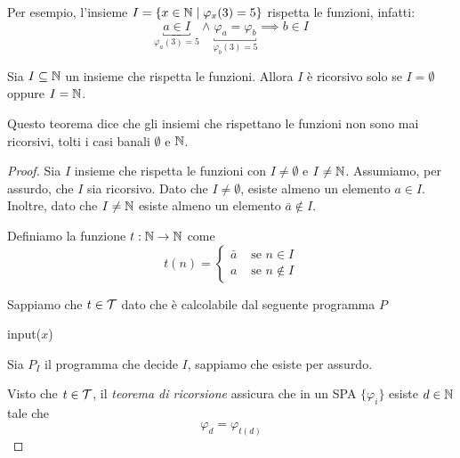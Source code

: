 Per esempio, l'insieme $I = \left\{x \in \mathbb{N} \mid \varphi_x (3) = 5 \right\}$ rispetta le funzioni, infatti:
$$
\underbracket{a \in I}_{\varphi_a (3) = 5} \wedge \underbracket{\varphi_a = \varphi_b}_{\varphi_b(3) = 5} \implies b \in I
$$

\begin{theor}
	Sia $I \subseteq \mathbb{N}$ un insieme che rispetta le funzioni. Allora $I$ è ricorsivo solo se $I = \emptyset$ oppure $I = \mathbb{N}$.
\end{theor}

Questo teorema dice che gli insiemi che rispettano le funzioni non sono mai ricorsivi, tolti i casi banali $\emptyset$ e $\mathbb{N}$.

\begin{proof}
	Sia $I$ insieme che rispetta le funzioni con $I \neq \emptyset$ e $I \neq \mathbb{N}$. Assumiamo, per assurdo, che $I$ sia ricorsivo. Dato che $I \neq \emptyset$, esiste almeno un elemento $a \in I$. Inoltre, dato che $I \neq \mathbb{N}$ esiste almeno un elemento $\bar{a} \notin I$.

	Definiamo la funzione $t: \mathbb{N} \rightarrow \mathbb{N}$ come
	$$
	t(n) = \begin{cases}
		\bar{a} & \text{ se } n \in I \\
		a & \text{ se } n \notin I
	\end{cases}
	$$

	Sappiamo che $t \in \mathcal{T}$ dato che è calcolabile dal seguente programma $P$
	\begin{center}
		\begin{minipage}{.45\textwidth}
			\begin{tcolorbox}[
				colback=white,
				sharp corners,
				boxrule=.3mm,
				left=20pt,
				top=0pt,
				bottom=0pt,
				colbacktitle=white,
				coltitle=black
				]
				\begin{algorithm}[H]
					input($x$)\\
				\end{algorithm}
			\end{tcolorbox}
		\end{minipage}
	\end{center}
    Sia $P_{I}$ il programma che decide $I$, sappiamo che esiste per assurdo.
    
	Visto che $t \in \mathcal{T}$, il \textit{teorema di ricorsione} assicura che in un SPA $\{\varphi_i\}$ esiste $d \in \mathbb{N}$ tale che
	$$ \varphi_d = \varphi_{t(d)} $$
    

\end{proof}
